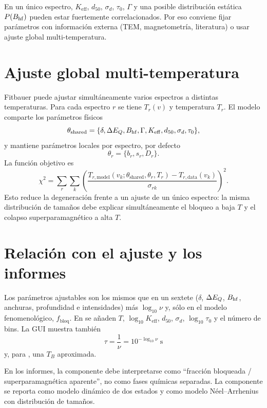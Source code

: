\begin{aviso}[Identificabilidad]
En un único espectro, $K_{\mathrm{eff}}$, $d_{50}$, $\sigma_d$, $\tau_0$, $\Gamma$
y una posible distribución estática $P(B_{\mathrm{hf}})$ pueden estar fuertemente
correlacionados. Por eso conviene fijar parámetros con información externa
(TEM, magnetometría, literatura) o usar ajuste global multi-temperatura.
\end{aviso}

\section{Ajuste global multi-temperatura}

Fitbauer puede ajustar simultáneamente varios espectros a distintas
temperaturas. Para cada espectro $r$ se tiene $T_r(v)$ y temperatura $T_r$. El modelo comparte los parámetros físicos
\begin{equation}
  \theta_{\mathrm{shared}}=\{\delta,\Delta E_{Q},B_{\mathrm{hf}},\Gamma,K_{\mathrm{eff}},d_{50},
  \sigma_d,\tau_0\},
\end{equation}
y mantiene parámetros locales por espectro, por defecto
\begin{equation}
  \theta_r=\{b_r,s_r,D_r\}.
\end{equation}
La función objetivo es
\begin{equation}
  \chi^2=\sum_r\sum_k
  \left(\frac{T_{r,\mathrm{model}}(v_k;\theta_{\mathrm{shared}},\theta_r,T_r)
  -T_{r,\mathrm{data}}(v_k)}{\sigma_{rk}}\right)^2.
\end{equation}
Esto reduce la degeneración frente a un ajuste de un único espectro: la misma
distribución de tamaños debe explicar simultáneamente el bloqueo a baja
$T$ y el colapso superparamagnético a alta $T$.

\section{Relación con el ajuste y los informes}

Los parámetros ajustables son los mismos que en un sextete ($\delta$, $\Delta E_{Q}$,
$B_{\mathrm{hf}}$, anchuras, profundidad e intensidades) más $\log_{10}\nu$ y, sólo en el
modelo fenomenológico, $f_{\mathrm{bloq}}$. En  se añaden $T$,
$\log_{10}K_{\mathrm{eff}}$, $d_{50}$, $\sigma_d$, $\log_{10}\tau_0$ y el número
de bins. La GUI muestra también
\begin{equation}
  \tau=\frac{1}{\nu}=10^{-\log_{10}\nu}\;\mathrm{s}
\end{equation}
y, para , una $T_B$ aproximada.

En los informes, la componente  debe interpretarse como
``fracción bloqueada / superparamagnética aparente'', no como fases químicas
separadas. La componente  se reporta como modelo dinámico de dos
estados y  como modelo Néel--Arrhenius con distribución de tamaños.
